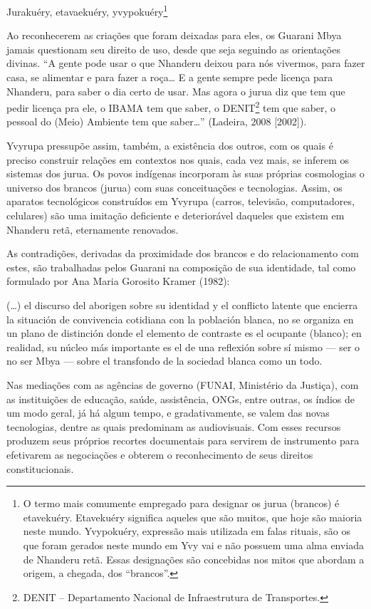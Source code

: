 Jurakuéry, etavaekuéry, yvypokuéry\footnote{O termo mais comumente
empregado para designar os jurua (brancos) é etavekuéry. Etavekuéry
significa aqueles que são muitos, que hoje são maioria neste mundo.
Yvypokuéry, expressão mais utilizada em falas rituais, são os que foram
gerados neste mundo em Yvy vai e não possuem uma alma enviada de
Nhanderu retã. Essas designações são concebidas nos mitos que abordam a
origem, a chegada, dos ``brancos''.}

Ao reconhecerem as criações que foram deixadas para eles, os Guarani
Mbya jamais questionam seu direito de uso, desde que seja seguindo as
orientações divinas. ``A gente pode usar o que Nhanderu deixou para nós
vivermos, para fazer casa, se alimentar e para fazer a roça\ldots{} E a
gente sempre pede licença para Nhanderu, para saber o dia certo de
usar. Mas agora o jurua diz que tem que pedir licença pra ele, o IBAMA
tem que saber, o DENIT\footnote{DENIT – Departamento Nacional de
Infraestrutura de Transportes.} tem que saber, o pessoal do (Meio)
Ambiente tem que saber\ldots{}'' (Ladeira, 2008 [2002]).

Yvyrupa pressupõe assim, também, a existência dos outros, com os quais é
preciso construir relações em contextos nos quais, cada vez mais, se
inferem os sistemas dos jurua. Os povos indígenas incorporam às suas
próprias cosmologias o universo dos brancos (jurua) com suas
conceituações e tecnologias. Assim, os aparatos tecnológicos
construídos em Yvyrupa (carros, televisão, computadores, celulares) são
uma imitação deficiente e deteriorável daqueles que existem em Nhanderu
retã, eternamente renovados.

As contradições, derivadas da proximidade dos brancos e do
relacionamento com estes, são trabalhadas pelos Guarani na  composição
de sua identidade, tal como formulado por Ana Maria Gorosito Kramer
(1982):  

(\ldots{}) el discurso del aborigen sobre su identidad y el conflicto latente
que encierra la situación de convivencia cotidiana con la población
blanca, no se organiza en un plano de distinción donde el elemento de
contraste es el ocupante (blanco); en realidad, su núcleo más
importante es el de una reflexión sobre sí mismo — ser o no ser Mbya —
sobre el transfondo de la sociedad blanca como un todo.  

Nas mediações com as agências de governo (FUNAI, Ministério da Justiça),
com as instituições de educação, saúde, assistência, ONGs, entre
outras, os índios de um modo geral, já há algum tempo, e
gradativamente, se valem das novas tecnologias, dentre as quais
predominam as audiovisuais. Com esses recursos produzem seus próprios
recortes documentais para servirem de instrumento para efetivarem as
negociações e obterem o reconhecimento de seus direitos
constitucionais.

